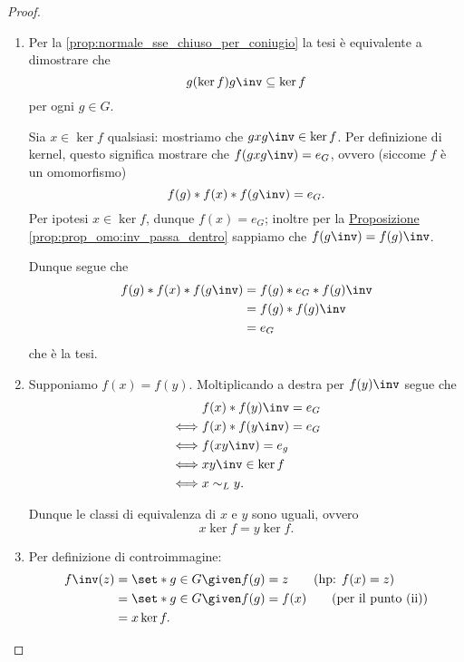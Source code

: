 \begin{proof}
    \begin{enumerate}[label={(\roman*)}]
        \item Per la \autoref{prop:normale_sse_chiuso_per_coniugio} la tesi è equivalente a dimostrare che \[
            g(\ker f) g\inv \subseteq \ker f   
        \] per ogni $g \in G$.
        
        Sia $x \in \ker f$ qualsiasi: mostriamo che $gxg\inv \in \ker f$. Per definizione di kernel, questo significa mostrare che $f(gxg\inv) = e_G$, ovvero (siccome $f$ è un omomorfismo) \[
            f(g) * f(x) * f(g\inv) = e_G.    
        \] Per ipotesi $x \in \ker f$, dunque $f(x) = e_G$; inoltre per la \hyperref[prop:prop_omo:inv_passa_dentro]{Proposizione \ref*{prop:prop_omo:inv_passa_dentro}} sappiamo che $f(g\inv) = f(g)\inv$.
        
        Dunque segue che \begin{align*}
            f(g) * f(x) * f(g\inv) &= f(g) * e_G * f(g)\inv\\
            &= f(g) * f(g)\inv \\
            &= e_G
        \end{align*} che è la tesi.
        \item Supponiamo $f(x) = f(y)$. Moltiplicando a destra per $f(y)\inv$ segue che \begin{align*}
            &f(x) * f(y)\inv = e_G \\
            \iff &f(x) * f(y\inv) = e_G \\
            \iff &f(xy\inv) = e_g\\
            \iff &xy\inv \in \ker f\\
            \iff &x \sim_L y.
        \end{align*}
        
        Dunque le classi di equivalenza di $x$ e $y$ sono uguali, ovvero \[
            x\ker f = y\ker f.    
        \]
        \item Per definizione di controimmagine: \begin{align*}
            f\inv(z) &= \set*{g \in G \given f(g) = z} \tag{hp: $f(x) = z$} \\
            &= \set*{g \in G \given f(g) = f(x)} \tag{per il punto (ii)}\\
            &= x\ker f. \tag*{\qedhere}
        \end{align*}
    \end{enumerate}
\end{proof}

